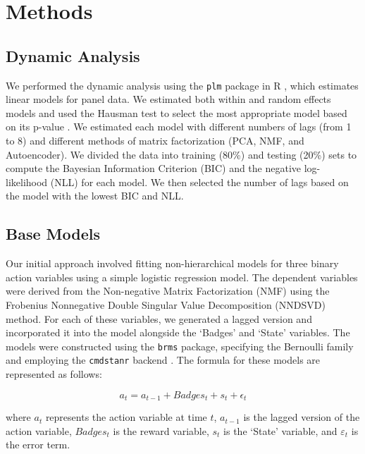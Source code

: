 \documentclass[
  number,
  preprint,
  3p,
  onecolumn]{elsarticle}
\begin{document}
\hypertarget{methods}{%
\section{Methods}\label{methods}}

\hypertarget{dynamic-analysis}{%
\subsection{Dynamic Analysis}\label{dynamic-analysis}}

We performed the dynamic analysis using the \texttt{plm} package in R
\citep{croissant2008}, which estimates linear models for panel data. We
estimated both within and random effects models and used the Hausman
test to select the most appropriate model based on its p-value
\citep{hausman1978}. We estimated each model with different numbers of
lags (from 1 to 8) and different methods of matrix factorization (PCA,
NMF, and Autoencoder). We divided the data into training (80\%) and
testing (20\%) sets to compute the Bayesian Information Criterion (BIC)
and the negative log-likelihood (NLL) for each model. We then selected
the number of lags based on the model with the lowest BIC and NLL.

\hypertarget{base-models}{%
\subsection{Base Models}\label{base-models}}

Our initial approach involved fitting non-hierarchical models for three
binary action variables using a simple logistic regression model. The
dependent variables were derived from the Non-negative Matrix
Factorization (NMF) using the Frobenius Nonnegative Double Singular
Value Decomposition (NNDSVD) method. For each of these variables, we
generated a lagged version and incorporated it into the model alongside
the `Badges' and `State' variables. The models were constructed using
the \texttt{brms} package, specifying the Bernoulli family and employing
the \texttt{cmdstanr} backend
\citep{bates2015, bürkner2017, gabry2022, stanmod2022, bürkner2021, croissant2008}.
The formula for these models are represented as follows:

\[
a_t = a_{t-1} + Badges_t + s_t + \epsilon_t
\]

where \(a_t\) represents the action variable at time \(t\), \(a_{t-1}\)
is the lagged version of the action variable, \(Badges_t\) is the reward
variable, \(s_t\) is the `State' variable, and \(ε_t\) is the error
term.
\end{document}
